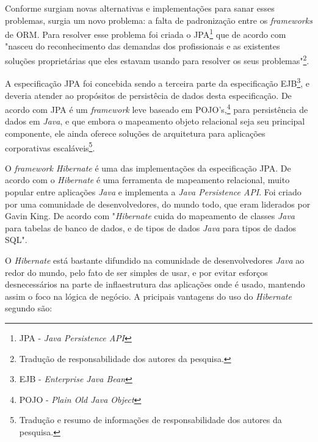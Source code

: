 	\par Conforme surgiam novas alternativas e implementações para sanar esses
problemas, surgia um novo problema: a falta de padronização entre os
\textit{frameworks} de ORM. Para resolver esse problema foi criada o
JPA\footnote{JPA - \textit{Java Persistence API}} que de acordo com
 "nasceu do reconhecimento das demandas dos
profissionais e as existentes soluções proprietárias que eles estavam usando
para resolver os seus problemas"\footnote{Tradução de responsabilidade dos
autores da pesquisa.}. 
	
	\par A especificação JPA foi concebida sendo a terceira parte da
especificação EJB\footnote{EJB - \textit{Enterprise Java Bean}}, e deveria
atender ao propósitos de persistêcia de dados desta especificação.
De acordo com  JPA é um \textit{framework} leve
baseado em POJO's,\footnote{POJO - \textit{Plain Old Java Object }} para
persistência de dados em \textit{Java}, e que embora o mapeamento objeto
relacional seja seu principal componente, ele ainda oferece soluções de
arquitetura para aplicações corporativas escaláveis\footnote{Tradução e resumo
de informações de responsabilidade dos autores da pesquisa.}.

	\par O \textit{framework Hibernate} é uma das implementações da especificação
JPA. De acordo com  o \textit{Hibernate} é
uma ferramenta de mapeamento relacional, muito popular entre aplicações
\textit{Java} e implementa a \textit{Java Persistence API}. Foi criado por uma
comunidade de desenvolvedores, do mundo todo, que eram liderados por Gavin King.
De acordo com  "\textit{Hibernate} cuida do mapeamento
de classes \textit{Java} para tabelas de banco de dados, e de tipos de dados
\textit{Java} para tipos de dados SQL".

	\par O \textit{Hibernate} está bastante difundido na comunidade de
desenvolvedores \textit{Java} ao redor do mundo, pelo fato de ser simples de
usar, e por evitar esforços desnecessários na parte de inflaestrutura das
aplicações onde é usado, mantendo assim o foco na lógica de negócio. A pricipais
vantagens do uso do \textit{Hibernate} segundo
 são:

